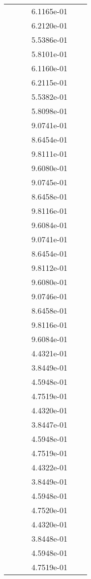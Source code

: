 \begin{xltabular}{\textwidth}{r|rS[table-format=1.3e+2]S[table-format=1.4e+2]S[table-format=1.4e+2]S[table-format=-1.5]}
&  &  & 6.1165e-01 & & \\
&  &  & 6.2120e-01 & & \\
&  &  & 5.5386e-01 & & \\
&  &  & 5.8101e-01 & & \\
&  &  & 6.1160e-01 & & \\
&  &  & 6.2115e-01 & & \\
&  &  & 5.5382e-01 & & \\
&  &  & 5.8098e-01 & & \\
&  &  & 9.0741e-01 & & \\
&  &  & 8.6454e-01 & & \\
&  &  & 9.8111e-01 & & \\
&  &  & 9.6080e-01 & & \\
&  &  & 9.0745e-01 & & \\
&  &  & 8.6458e-01 & & \\
&  &  & 9.8116e-01 & & \\
&  &  & 9.6084e-01 & & \\
&  &  & 9.0741e-01 & & \\
&  &  & 8.6454e-01 & & \\
&  &  & 9.8112e-01 & & \\
&  &  & 9.6080e-01 & & \\
&  &  & 9.0746e-01 & & \\
&  &  & 8.6458e-01 & & \\
&  &  & 9.8116e-01 & & \\
&  &  & 9.6084e-01 & & \\
&  &  & 4.4321e-01 & & \\
&  &  & 3.8449e-01 & & \\
&  &  & 4.5948e-01 & & \\
&  &  & 4.7519e-01 & & \\
&  &  & 4.4320e-01 & & \\
&  &  & 3.8447e-01 & & \\
&  &  & 4.5948e-01 & & \\
&  &  & 4.7519e-01 & & \\
&  &  & 4.4322e-01 & & \\
&  &  & 3.8449e-01 & & \\
&  &  & 4.5948e-01 & & \\
&  &  & 4.7520e-01 & & \\
&  &  & 4.4320e-01 & & \\
&  &  & 3.8448e-01 & & \\
&  &  & 4.5948e-01 & & \\
&  &  & 4.7519e-01 & & \\

\end{xltabular}
